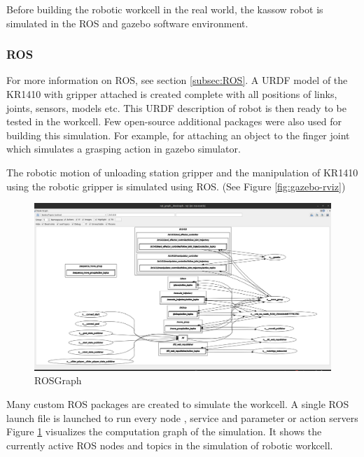 Before building the robotic workcell in the real world, the kassow robot is simulated in the ROS and gazebo software environment.

\subsubsection{ROS}
\label{subsubsec:ROS}
For more information on ROS, see section \ref{subsec:ROS}. A URDF model of the KR1410 with gripper attached is created
complete with all positions of links, joints, sensors, models etc. This URDF description of robot is then ready to be tested
in the workcell. Few open-source additional packages were also used for building this simulation. For example, for attaching an
object to the finger joint which simulates a grasping action in gazebo simulator. \cite{gazebo-pkgs}

The robotic motion of unloading station gripper and the manipulation of KR1410 using the robotic gripper is simulated using ROS. (See Figure \ref{fig:gazebo-rviz})

\begin{figure}[h]
    \centering
    \includegraphics[width=\textwidth]{figures/rosgraph.png}
    \caption{ROSGraph}
    \label{fig:rosgraph}
\end{figure}

Many custom ROS packages \cite{rospackage} are created to simulate the workcell. A single ROS launch \cite{roslaunch} file is launched to run every node \cite{rosnode}, service \cite{rosservice} and parameter \cite{parameterserver} or action servers \cite{actionserver}
Figure \ref{fig:rosgraph} visualizes the computation graph of the simulation. It shows the currently active ROS nodes \cite{rosnode}
and topics \cite{rostopic} in the simulation of robotic workcell.


